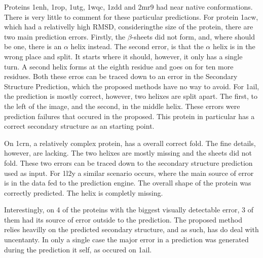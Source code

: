Proteins 1enh, 1rop, 1utg, 1wqc, 1zdd and 2mr9 had near native conformations.
There is very little to comment for these particular predictions. For protein 1acw,
which had a relativelly high RMSD, consideringthe size of the protein, there are
two main prediction errors. Firstly, the $\beta$-sheets did not form, and, where
should be one, there is an $\alpha$ helix instead. The second error, is that the
$\alpha$ helix is in the wrong place and split. It starts where it should,
however, it only has a single turn. A second helix forms at the eighth residue
and goes on for ten more residues. Both these erros can be traced down to an
error in the Secondary Structure Prediction, which the proposed methods have no
way to avoid. For 1ail, the prediction is mostly correct, however, two helixes
are split apart. The first, to the left of the image, and the second, in the
middle helix. These errors were prediction failures that occured in the proposed.
This protein in particular has a correct secondary structure as an starting
point.

On 1crn, a relatively complex protein, has a overall correct fold. The fine
details, however, are lacking. The two helixes are mostly missing and the
sheets did not fold. These two errors can be traced down to the secondary
structure prediction used as input. For 1l2y a similar scenario occurs, where
the main source of error is in the data fed to the prediction engine. The
overall shape of the protein was correctly predicted. The helix is completly
missing.

Interestingly, on 4 of the proteins with the biggest visually detectable error,
3 of them had its source of error outside to the prediction. The proposed method
relies heavilly on the predicted secondary structure, and as such, has do deal
with uncentanty. In only a single case the major error in a prediction was
generated during the prediction it self, as occured on 1ail.
